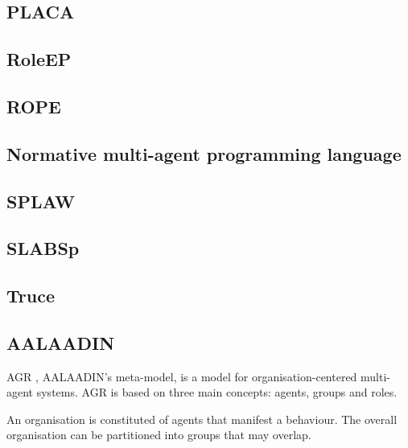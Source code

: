 \documentclass{article}
\begin{document}
\cite{conf/rex/BarringerFGGO89}

\subsection{PLACA}

\cite{}

\subsection{RoleEP}

\cite{ubayashi2002roleep}

\subsection{ROPE}

\cite{conf/coopis/BechtGKM99}

\subsection{Normative multi-agent programming language}

\cite{conf/promas/TinnemeierDM08}

\subsection{SPLAW}

\cite{}

\subsection{SLABSp}

\cite{conf/atal/WangSZ05}

\subsection{Truce}

\cite{conf/coordination/JamisonL99}

\subsection{AALAADIN} 
\label{sec:aalaadin}

AGR \cite{conf/aose/FerberGM03}, AALAADIN's meta-model, is a model for organisation-centered
multi-agent systems. AGR is based on three main concepts: agents,
groups and roles.

An organisation is constituted of agents that manifest a behaviour.
The overall organisation can be partitioned into groups that may
overlap. 
\end{document}
